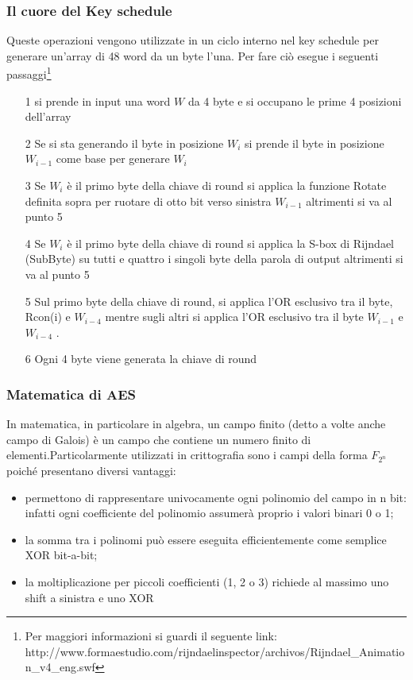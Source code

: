 \documentclass[10pt,a4paper]{article}
\begin{document}
\subsubsection{Il cuore del Key schedule}
Queste operazioni vengono utilizzate in un ciclo interno nel key schedule per generare un'array di 48 word da un byte l'una. Per fare ciò esegue i seguenti passaggi\footnote{Per maggiori informazioni si guardi il seguente link: http://www.formaestudio.com/rijndaelinspector/archivos/Rijndael\_Animation\_v4\_eng.swf }
\begin{itemize}
\item[1] si prende in input una word $W$ da 4 byte e si occupano le prime 4 posizioni dell'array
\item[2] Se si sta generando il byte in posizione $W_i$ si prende il byte in posizione $W_{i-1}$ come base per generare $W_i$
\item[3] Se $W_i$ è il primo byte della chiave di round si applica la funzione Rotate definita sopra per ruotare di otto bit verso sinistra $W_{i-1}$ altrimenti si va al punto 5
\item[4] Se $W_i$ è il primo byte della chiave di round si applica la S-box di Rijndael (SubByte) su tutti e quattro i singoli byte della parola di output altrimenti si va al punto 5
\item[5] Sul primo byte della chiave di round, si applica l'OR esclusivo tra il byte, Rcon(i) e $W_{i-4}$ mentre sugli altri si applica l'OR esclusivo tra il byte $W_{i-1}$ e $W_{i-4}$	.
\item[6] Ogni 4 byte viene generata la chiave di round
\end{itemize}

\subsubsection{Matematica di AES}
In matematica, in particolare in algebra, un campo finito (detto a volte anche campo di Galois) è un campo che contiene un numero finito di elementi.Particolarmente utilizzati in crittografia sono i campi della forma $F_{2^n}$ poiché presentano diversi vantaggi:
\begin{itemize}
\item permettono di rappresentare univocamente ogni polinomio del campo in n bit: infatti ogni coefficiente del polinomio assumerà proprio i valori binari 0 o 1;
\item la somma tra i polinomi può essere eseguita efficientemente come semplice XOR bit-a-bit;
\item la moltiplicazione per piccoli coefficienti (1, 2 o 3) richiede al massimo uno shift a sinistra e uno XOR
\end{itemize}
\end{document}
